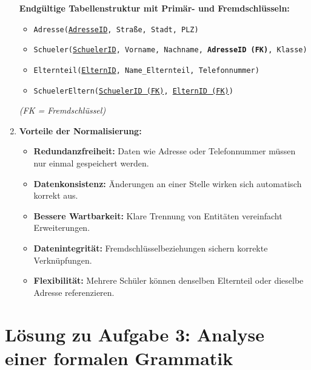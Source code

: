 \documentclass[a4paper,12pt]{article}
\begin{document}
\begin{enumerate}
	\vspace{1em}
	
	\textbf{Endgültige Tabellenstruktur mit Primär- und Fremdschlüsseln:}
	
	\begin{itemize}
		\item \texttt{Adresse(\underline{AdresseID}, Straße, Stadt, PLZ)}
		\item \texttt{Schueler(\underline{SchuelerID}, Vorname, Nachname, \textbf{AdresseID (FK)}, Klasse)}
		\item \texttt{Elternteil(\underline{ElternID}, Name\_Elternteil, Telefonnummer)}
		\item \texttt{SchuelerEltern(\underline{SchuelerID (FK)}, \underline{ElternID (FK)})}
	\end{itemize}
	
	\textit{(FK = Fremdschlüssel)}
	
	\vspace{1em}
	
	\item \textbf{Vorteile der Normalisierung:}
	\begin{itemize}
		\item \textbf{Redundanzfreiheit:} Daten wie Adresse oder Telefonnummer müssen nur einmal gespeichert werden.
		\item \textbf{Datenkonsistenz:} Änderungen an einer Stelle wirken sich automatisch korrekt aus.
		\item \textbf{Bessere Wartbarkeit:} Klare Trennung von Entitäten vereinfacht Erweiterungen.
		\item \textbf{Datenintegrität:} Fremdschlüsselbeziehungen sichern korrekte Verknüpfungen.
		\item \textbf{Flexibilität:} Mehrere Schüler können denselben Elternteil oder dieselbe Adresse referenzieren.
	\end{itemize}
\end{enumerate}

	
	
	\vspace{2em}
	
	\section*{Lösung zu Aufgabe 3: Analyse einer formalen Grammatik}
	
\end{document}

